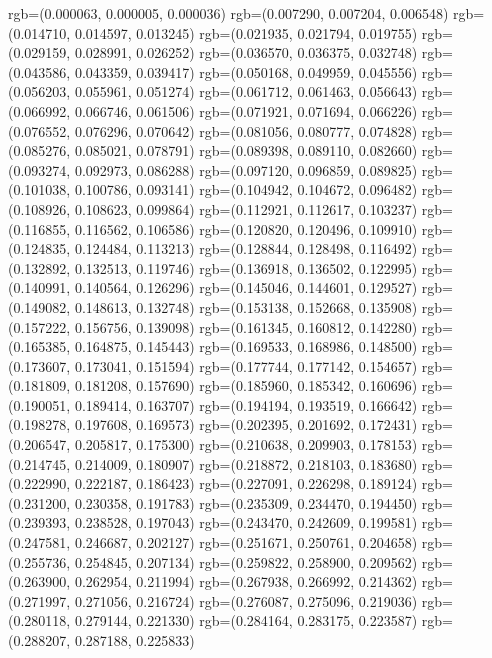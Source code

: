{{{					rgb=(0.000063, 0.000005, 0.000036)
					rgb=(0.007290, 0.007204, 0.006548)
					rgb=(0.014710, 0.014597, 0.013245)
					rgb=(0.021935, 0.021794, 0.019755)
					rgb=(0.029159, 0.028991, 0.026252)
					rgb=(0.036570, 0.036375, 0.032748)
					rgb=(0.043586, 0.043359, 0.039417)
					rgb=(0.050168, 0.049959, 0.045556)
					rgb=(0.056203, 0.055961, 0.051274)
					rgb=(0.061712, 0.061463, 0.056643)
					rgb=(0.066992, 0.066746, 0.061506)
					rgb=(0.071921, 0.071694, 0.066226)
					rgb=(0.076552, 0.076296, 0.070642)
					rgb=(0.081056, 0.080777, 0.074828)
					rgb=(0.085276, 0.085021, 0.078791)
					rgb=(0.089398, 0.089110, 0.082660)
					rgb=(0.093274, 0.092973, 0.086288)
					rgb=(0.097120, 0.096859, 0.089825)
					rgb=(0.101038, 0.100786, 0.093141)
					rgb=(0.104942, 0.104672, 0.096482)
					rgb=(0.108926, 0.108623, 0.099864)
					rgb=(0.112921, 0.112617, 0.103237)
					rgb=(0.116855, 0.116562, 0.106586)
					rgb=(0.120820, 0.120496, 0.109910)
					rgb=(0.124835, 0.124484, 0.113213)
					rgb=(0.128844, 0.128498, 0.116492)
					rgb=(0.132892, 0.132513, 0.119746)
					rgb=(0.136918, 0.136502, 0.122995)
					rgb=(0.140991, 0.140564, 0.126296)
					rgb=(0.145046, 0.144601, 0.129527)
					rgb=(0.149082, 0.148613, 0.132748)
					rgb=(0.153138, 0.152668, 0.135908)
					rgb=(0.157222, 0.156756, 0.139098)
					rgb=(0.161345, 0.160812, 0.142280)
					rgb=(0.165385, 0.164875, 0.145443)
					rgb=(0.169533, 0.168986, 0.148500)
					rgb=(0.173607, 0.173041, 0.151594)
					rgb=(0.177744, 0.177142, 0.154657)
					rgb=(0.181809, 0.181208, 0.157690)
					rgb=(0.185960, 0.185342, 0.160696)
					rgb=(0.190051, 0.189414, 0.163707)
					rgb=(0.194194, 0.193519, 0.166642)
					rgb=(0.198278, 0.197608, 0.169573)
					rgb=(0.202395, 0.201692, 0.172431)
					rgb=(0.206547, 0.205817, 0.175300)
					rgb=(0.210638, 0.209903, 0.178153)
					rgb=(0.214745, 0.214009, 0.180907)
					rgb=(0.218872, 0.218103, 0.183680)
					rgb=(0.222990, 0.222187, 0.186423)
					rgb=(0.227091, 0.226298, 0.189124)
					rgb=(0.231200, 0.230358, 0.191783)
					rgb=(0.235309, 0.234470, 0.194450)
					rgb=(0.239393, 0.238528, 0.197043)
					rgb=(0.243470, 0.242609, 0.199581)
					rgb=(0.247581, 0.246687, 0.202127)
					rgb=(0.251671, 0.250761, 0.204658)
					rgb=(0.255736, 0.254845, 0.207134)
					rgb=(0.259822, 0.258900, 0.209562)
					rgb=(0.263900, 0.262954, 0.211994)
					rgb=(0.267938, 0.266992, 0.214362)
					rgb=(0.271997, 0.271056, 0.216724)
					rgb=(0.276087, 0.275096, 0.219036)
					rgb=(0.280118, 0.279144, 0.221330)
					rgb=(0.284164, 0.283175, 0.223587)
					rgb=(0.288207, 0.287188, 0.225833)
}}}
